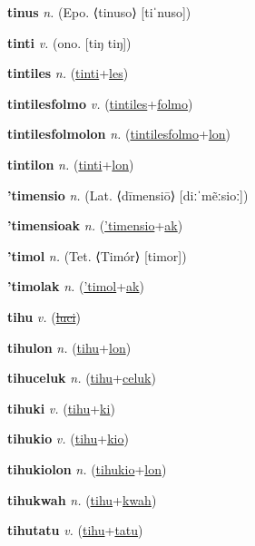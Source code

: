 \textbf{\hypertarget{tinus}{tinus}} \textit{n.} (Epo. ⟨tinuso⟩ [tiˈnuso])


\textbf{\hypertarget{tinti}{tinti}} \textit{v.} (ono. [tiŋ tiŋ])


\textbf{\hypertarget{tintiles}{tintiles}} \textit{n.} (\hyperlink{tinti}{tinti}+\allowbreak \hyperlink{les}{les})


\textbf{\hypertarget{tintilesfolmo}{tintilesfolmo}} \textit{v.} (\hyperlink{tintiles}{tintiles}+\allowbreak \hyperlink{folmo}{folmo})


\textbf{\hypertarget{tintilesfolmolon}{tintilesfolmolon}} \textit{n.} (\hyperlink{tintilesfolmo}{tintilesfolmo}+\allowbreak \hyperlink{lon}{lon})


\textbf{\hypertarget{tintilon}{tintilon}} \textit{n.} (\hyperlink{tinti}{tinti}+\allowbreak \hyperlink{lon}{lon})


\textbf{\hypertarget{'timensio}{'timensio}} \textit{n.} (Lat. ⟨dīmensiō⟩ [diːˈmẽːsioː])


\textbf{\hypertarget{'timensioak}{'timensioak}} \textit{n.} (\hyperlink{'timensio}{'timensio}+\allowbreak \hyperlink{ak}{ak})


\textbf{\hypertarget{'timol}{'timol}} \textit{n.} (Tet. ⟨Timór⟩ [timor])


\textbf{\hypertarget{'timolak}{'timolak}} \textit{n.} (\hyperlink{'timol}{'timol}+\allowbreak \hyperlink{ak}{ak})


\textbf{\hypertarget{tihu}{tihu}} \textit{v.} (\hyperlink{luci}{\sout{luci}})


\textbf{\hypertarget{tihulon}{tihulon}} \textit{n.} (\hyperlink{tihu}{tihu}+\allowbreak \hyperlink{lon}{lon})


\textbf{\hypertarget{tihuceluk}{tihuceluk}} \textit{n.} (\hyperlink{tihu}{tihu}+\allowbreak \hyperlink{celuk}{celuk})


\textbf{\hypertarget{tihuki}{tihuki}} \textit{v.} (\hyperlink{tihu}{tihu}+\allowbreak \hyperlink{ki}{ki})


\textbf{\hypertarget{tihukio}{tihukio}} \textit{v.} (\hyperlink{tihu}{tihu}+\allowbreak \hyperlink{kio}{kio})


\textbf{\hypertarget{tihukiolon}{tihukiolon}} \textit{n.} (\hyperlink{tihukio}{tihukio}+\allowbreak \hyperlink{lon}{lon})


\textbf{\hypertarget{tihukwah}{tihukwah}} \textit{n.} (\hyperlink{tihu}{tihu}+\allowbreak \hyperlink{kwah}{kwah})


\textbf{\hypertarget{tihutatu}{tihutatu}} \textit{v.} (\hyperlink{tihu}{tihu}+\allowbreak \hyperlink{tatu}{tatu})


